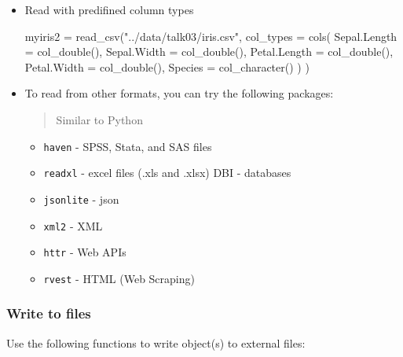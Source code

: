 \documentclass[
]{article}
\newenvironment{Shaded}{}{}
\newcommand{\AttributeTok}[1]{\textcolor[rgb]{0.49,0.56,0.16}{#1}}
\newcommand{\FunctionTok}[1]{\textcolor[rgb]{0.02,0.16,0.49}{#1}}
\newcommand{\NormalTok}[1]{#1}
\newcommand{\OtherTok}[1]{\textcolor[rgb]{0.00,0.44,0.13}{#1}}
\newcommand{\StringTok}[1]{\textcolor[rgb]{0.25,0.44,0.63}{#1}}
\begin{document}
\begin{itemize}
\item
  Read with predifined column types

\begin{Shaded}
\begin{Highlighting}[]
\NormalTok{myiris2 }\OtherTok{=}
	\FunctionTok{read\_csv}\NormalTok{(}\StringTok{"../data/talk03/iris.csv"}\NormalTok{, }
           \AttributeTok{col\_types =} 
           	\FunctionTok{cols}\NormalTok{( }
              \AttributeTok{Sepal.Length =} \FunctionTok{col\_double}\NormalTok{(),}
              \AttributeTok{Sepal.Width =} \FunctionTok{col\_double}\NormalTok{(),}
              \AttributeTok{Petal.Length =} \FunctionTok{col\_double}\NormalTok{(),}
              \AttributeTok{Petal.Width =} \FunctionTok{col\_double}\NormalTok{(),}
              \AttributeTok{Species =} \FunctionTok{col\_character}\NormalTok{() }
\NormalTok{            )}
\NormalTok{          )}
\end{Highlighting}
\end{Shaded}
\end{itemize}

\begin{itemize}
\item
  To read from other formats, you can try the following packages:

  \begin{quote}
  Similar to Python
  \end{quote}

  \begin{itemize}
  \item
    \texttt{haven} - SPSS, Stata, and SAS files
  \item
    \texttt{readxl} - excel files (.xls and .xlsx) DBI - databases
  \item
    \texttt{jsonlite} - json
  \item
    \texttt{xml2} - XML
  \item
    \texttt{httr} - Web APIs
  \item
    \texttt{rvest} - HTML (Web Scraping)
  \end{itemize}
\end{itemize}

\hypertarget{write-to-files}{%
\subsubsection{Write to files}\label{write-to-files}}

Use the following functions to write object(s) to external files:
\end{document}
